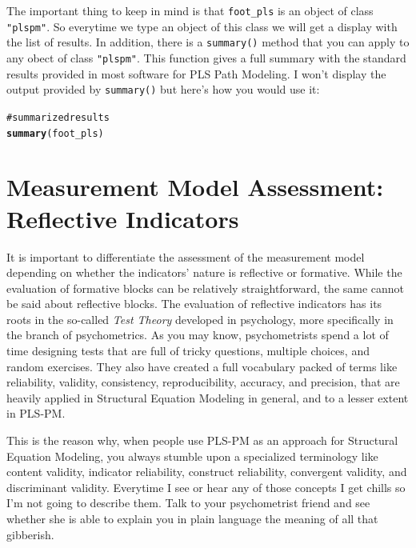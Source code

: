 \documentclass[12pt]{book}\usepackage{graphicx, color}
\makeatletter
\newcommand{\hlfunctioncall}[1]{\textcolor[rgb]{0.501960784313725,0,0.329411764705882}{\textbf{#1}}}%
\newcommand{\hlcomment}[1]{\textcolor[rgb]{0.180392156862745,0.6,0.341176470588235}{#1}}%
\newenvironment{kframe}{%
 \def\at@end@of@kframe{}%
 \ifinner\ifhmode%
  \def\at@end@of@kframe{\end{minipage}}%
  \begin{minipage}{\columnwidth}%
 \fi\fi%
 \def\FrameCommand##1{\hskip\@totalleftmargin \hskip-\fboxsep
 \colorbox{shadecolor}{##1}\hskip-\fboxsep
     \hskip-\linewidth \hskip-\@totalleftmargin \hskip\columnwidth}%
 \MakeFramed {\advance\hsize-\width
   \@totalleftmargin\z@ \linewidth\hsize
   \@setminipage}}%
 {\par\unskip\endMakeFramed%
 \at@end@of@kframe}
\newenvironment{knitrout}{}{} %
\newcommand{\code}[1]{\texttt{#1}}
\makeatother
\begin{document}
The important thing to keep in mind is that \code{foot\_pls} is an object of class \code{"plspm"}. So everytime we type an object of this class we will get a display with the list of results. In addition, there is a \code{summary()} method that you can apply to any obect of class \code{"plspm"}. This function gives a full summary with the standard results provided in most software for PLS Path Modeling. I won't display the output provided by \code{summary()} but here's how you would use it:
\begin{knitrout}
\color{fgcolor}\begin{kframe}
\begin{alltt}
\hlcomment{# summarized results}
\hlfunctioncall{summary}(foot_pls)
\end{alltt}
\end{kframe}
\end{knitrout}






\section{Measurement Model Assessment: \\ Reflective Indicators}
It is important to differentiate the assessment of the measurement model depending on whether the indicators' nature is reflective or formative. While the evaluation of formative blocks can be relatively straightforward, the same cannot be said about reflective blocks. The evaluation of reflective indicators has its roots in the so-called \textit{Test Theory} developed in psychology, more specifically in the branch of psychometrics. As you may know, psychometrists spend a lot of time designing tests that are full of tricky questions, multiple choices, and random exercises. They also have created a full vocabulary packed of terms like reliability, validity, consistency, reproducibility, accuracy, and precision, that are heavily applied in Structural Equation Modeling in general, and to a lesser extent in PLS-PM. 

This is the reason why, when people use PLS-PM as an approach for Structural Equation Modeling, you always stumble upon a specialized terminology like content validity, indicator reliability, construct reliability, convergent validity, and discriminant validity. Everytime I see or hear any of those concepts I get chills so I'm not going to describe them. Talk to your psychometrist friend and see whether she is able to explain you in plain language the meaning of all that gibberish.
\end{document}
